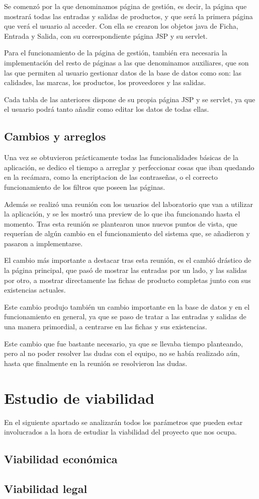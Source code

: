 Se comenzó por la que denominamos página de gestión, es decir, la página que mostrará todas las entradas y salidas de productos, y que será la primera página que verá el usuario al acceder. Con ella se crearon los objetos java de Ficha, Entrada y Salida, con su correspondiente página JSP y su servlet.

Para el funcionamiento de la página de gestión, también era necesaria la implementación del resto de páginas a las que denominamos auxiliares, que son las que permiten al usuario gestionar datos de la base de datos como son: las calidades, las marcas, los productos, los proveedores y las salidas.

Cada tabla de las anteriores dispone de su propia página JSP y se servlet, ya que el usuario podrá tanto añadir como editar los datos de todas ellas.


\subsection{Cambios y arreglos}

Una vez se obtuvieron prácticamente todas las funcionalidades básicas de la aplicación, se dedico el tiempo a arreglar y perfeccionar cosas que iban quedando en la recámara, como la encriptacion de las contraseñas, o el correcto funcionamiento de los filtros que poseen las páginas. 

Además se realizó una reunión con los usuarios del laboratorio que van a utilizar la aplicación, y se les mostró una preview de lo que iba funcionando hasta el momento. Tras esta reunión se plantearon unos nuevos puntos de vista, que requerían de algún cambio en el funcionamiento del sistema que, se añadieron y pasaron a implementarse.

El cambio más importante a destacar tras esta reunión, es el cambió drástico de la página principal, que pasó de mostrar las entradas por un lado, y las salidas por otro, a mostrar directamente las fichas de producto completas junto con sus existencias actuales.

Este cambio produjo también un cambio importante en la base de datos y en el funcionamiento en general, ya que se paso de tratar a las entradas y salidas de una manera primordial, a centrarse en las fichas y sus existencias. 

Este cambio que fue bastante necesario, ya que se llevaba tiempo planteando, pero al no poder resolver las dudas con el equipo, no se había realizado aún, hasta que finalmente en la reunión se resolvieron las dudas.

\section{Estudio de viabilidad}

En el siguiente apartado se analizarán todos los parámetros que pueden estar involucrados a la hora de estudiar la viabilidad del proyecto que nos ocupa.

\subsection{Viabilidad económica}

\subsection{Viabilidad legal}


